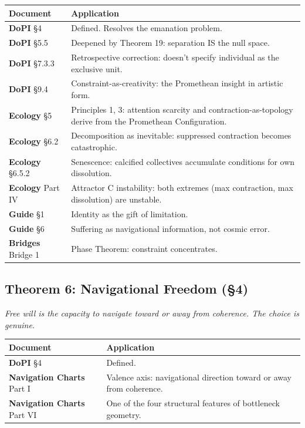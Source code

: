 \begin{longtable}{p{} p{}}
\toprule
\textbf{Document} & \textbf{Application} \\
\midrule
\endhead
\textbf{DoPI} §4 & Defined. Resolves the emanation problem. \\
\textbf{DoPI} §5.5 & Deepened by Theorem 19: separation IS the null space. \\
\textbf{DoPI} §7.3.3 & Retrospective correction: doesn't specify individual as the exclusive unit. \\
\textbf{DoPI} §9.4 & Constraint-as-creativity: the Promethean insight in artistic form. \\
\textbf{Ecology} §5 & Principles 1, 3: attention scarcity and contraction-as-topology derive from the Promethean Configuration. \\
\textbf{Ecology} §6.2 & Decomposition as inevitable: suppressed contraction becomes catastrophic. \\
\textbf{Ecology} §6.5.2 & Senescence: calcified collectives accumulate conditions for own dissolution. \\
\textbf{Ecology} Part IV & Attractor C instability: both extremes (max contraction, max dissolution) are unstable. \\
\textbf{Guide} §1 & Identity as the gift of limitation. \\
\textbf{Guide} §6 & Suffering as navigational information, not cosmic error. \\
\textbf{Bridges} Bridge 1 & Phase Theorem: constraint concentrates. \\
\bottomrule
\end{longtable}



\subsection*{Theorem 6: Navigational Freedom (§4)}


\textit{Free will is the capacity to navigate toward or away from coherence. The choice is genuine.}



\begin{longtable}{p{} p{}}
\toprule
\textbf{Document} & \textbf{Application} \\
\midrule
\endhead
\textbf{DoPI} §4 & Defined. \\
\textbf{Navigation Charts} Part I & Valence axis: navigational direction toward or away from coherence. \\
\textbf{Navigation Charts} Part VI & One of the four structural features of bottleneck geometry. \\
\bottomrule
\end{longtable}



